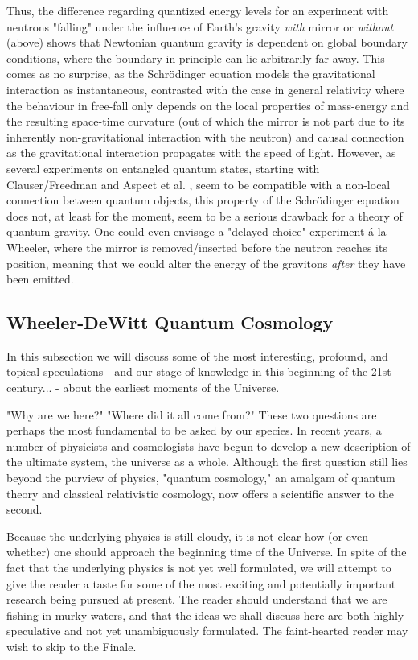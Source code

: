 	Thus, the difference regarding quantized energy levels for an experiment with neutrons "falling" under the influence of Earth's gravity \textit{with} mirror or \textit{without} (above) shows that Newtonian quantum gravity is dependent on global boundary conditions, where the boundary in principle can lie arbitrarily far away. This comes as no surprise, as the Schrödinger equation models the gravitational interaction as instantaneous, contrasted with the case in general relativity where the behaviour in free-fall only depends on the local properties of mass-energy and the resulting space-time	curvature (out of which the mirror is not part due to its	inherently non-gravitational interaction with the neutron) and causal connection as the gravitational interaction propagates with	the speed of light. However, as several experiments on entangled quantum states, starting with Clauser/Freedman and Aspect et al. , seem to be compatible with a non-local connection between quantum objects, this property of the Schr\"{o}dinger equation does not, at least for	the moment, seem to be a serious drawback for a theory of quantum gravity. One could even envisage a "delayed choice" experiment	\'{a} la Wheeler, where the mirror is removed/inserted before the	neutron reaches its position, meaning that we could alter the 	energy of the gravitons \textit{after} they have been emitted.
	
	\pagebreak
	\subsection{Wheeler-DeWitt Quantum Cosmology}
	In this subsection we will discuss some of the most interesting, profound, and topical speculations - and our stage of knowledge in this beginning of the 21st century... - about the earliest moments of the Universe. 
	
	"Why are we here?" "Where did it all come from?" These two questions are perhaps the most fundamental to be asked by our species. In recent years, a number of physicists and cosmologists have begun to develop a new description of the ultimate system, the universe as a whole. Although the first question still lies beyond the purview of physics, "quantum cosmology," an amalgam of quantum theory and classical relativistic cosmology, now offers a scientific answer to the second.
	
	Because the underlying physics is still cloudy, it is not clear how (or even whether) one should approach the beginning time of the Universe. In spite of the fact that the underlying physics is not yet well formulated, we will attempt to give the reader a taste for some of the most exciting and potentially important research being pursued at present. The reader should understand that we are fishing in murky waters, and that the ideas we shall discuss here are both highly speculative and not yet unambiguously formulated. The faint-hearted reader may wish to skip to the Finale.
	
